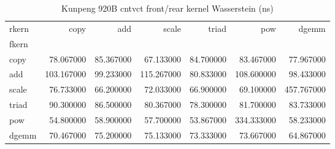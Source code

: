 \begin{table}
\caption{Kunpeng 920B cntvct front/rear kernel Wasserstein (ns)}
\begin{tabular}{lrrrrrr}
\toprule
rkern & copy & add & scale & triad & pow & dgemm \\
fkern &  &  &  &  &  &  \\
\midrule
copy & 78.067000 & 85.367000 & 67.133000 & 84.700000 & 83.467000 & 77.967000 \\
add & 103.167000 & 99.233000 & 115.267000 & 80.833000 & 108.600000 & 98.433000 \\
scale & 76.733000 & 66.200000 & 72.033000 & 66.900000 & 69.100000 & 457.767000 \\
triad & 90.300000 & 86.500000 & 80.367000 & 78.300000 & 81.700000 & 83.733000 \\
pow & 54.800000 & 58.900000 & 57.700000 & 53.867000 & 334.333000 & 58.233000 \\
dgemm & 70.467000 & 75.200000 & 75.133000 & 73.333000 & 73.667000 & 64.867000 \\
\bottomrule
\end{tabular}
\end{table}
